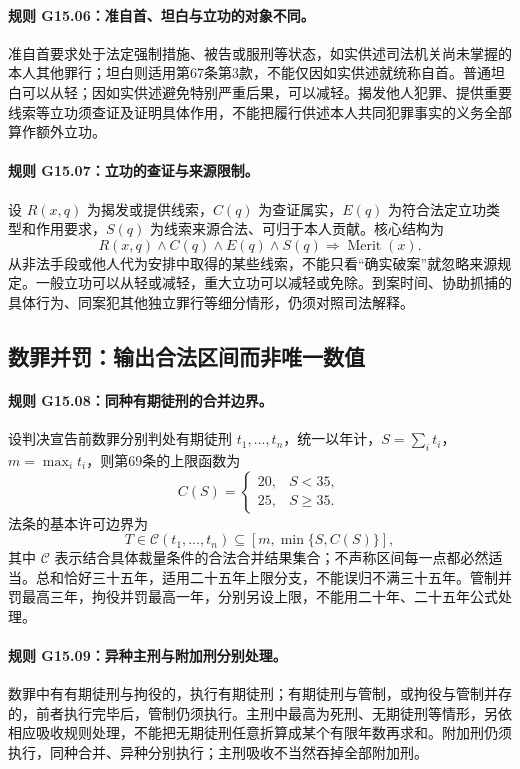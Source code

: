\paragraph{规则 G15.06：准自首、坦白与立功的对象不同。}
准自首要求处于法定强制措施、被告或服刑等状态，如实供述司法机关尚未掌握的本人其他罪行；坦白则适用第67条第3款，不能仅因如实供述就统称自首。普通坦白可以从轻；因如实供述避免特别严重后果，可以减轻。揭发他人犯罪、提供重要线索等立功须查证及证明具体作用，不能把履行供述本人共同犯罪事实的义务全部算作额外立功。

\paragraph{规则 G15.07：立功的查证与来源限制。}
设 $R(x,q)$ 为揭发或提供线索，$C(q)$ 为查证属实，$E(q)$ 为符合法定立功类型和作用要求，$S(q)$ 为线索来源合法、可归于本人贡献。核心结构为
\[
R(x,q)\land C(q)\land E(q)\land S(q)
\Longrightarrow\operatorname{Merit}(x).
\]
从非法手段或他人代为安排中取得的某些线索，不能只看“确实破案”就忽略来源规定。一般立功可以从轻或减轻，重大立功可以减轻或免除。到案时间、协助抓捕的具体行为、同案犯其他独立罪行等细分情形，仍须对照司法解释。

\subsection{数罪并罚：输出合法区间而非唯一数值}
\paragraph{规则 G15.08：同种有期徒刑的合并边界。}
设判决宣告前数罪分别判处有期徒刑 $t_1,\ldots,t_n$，统一以年计，$S=\sum_i t_i$，$m=\max_i t_i$，则第69条的上限函数为
\[
C(S)=\begin{cases}20,&S<35,\\25,&S\ge35.\end{cases}
\]
法条的基本许可边界为
\[
T\in\mathcal{C}(t_1,\ldots,t_n)
\subseteq [m,\min\{S,C(S)\}],
\]
其中 $\mathcal{C}$ 表示结合具体裁量条件的合法合并结果集合；不声称区间每一点都必然适当。总和恰好三十五年，适用二十五年上限分支，不能误归不满三十五年。管制并罚最高三年，拘役并罚最高一年，分别另设上限，不能用二十年、二十五年公式处理。

\paragraph{规则 G15.09：异种主刑与附加刑分别处理。}
数罪中有有期徒刑与拘役的，执行有期徒刑；有期徒刑与管制，或拘役与管制并存的，前者执行完毕后，管制仍须执行。主刑中最高为死刑、无期徒刑等情形，另依相应吸收规则处理，不能把无期徒刑任意折算成某个有限年数再求和。附加刑仍须执行，同种合并、异种分别执行；主刑吸收不当然吞掉全部附加刑。

